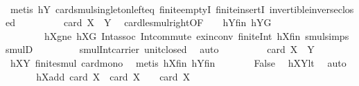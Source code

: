 \begin{isabellebody}
\ \ \ \ \ \ \isamarkupfalse%
\ {\isacharparenleft}{\kern0pt}metis\ hY{}\ card{\isacharunderscore}{\kern0pt}smul{\isacharunderscore}{\kern0pt}singleton{\isacharunderscore}{\kern0pt}left{\isacharunderscore}{\kern0pt}eq\ finite{\isachardot}{\kern0pt}emptyI\ finite{\isachardot}{\kern0pt}insertI\ invertible{\isacharunderscore}{\kern0pt}inverse{\isacharunderscore}{\kern0pt}closed{\isacharparenright}{\kern0pt}\isanewline
\ \ \ \ \isamarkupfalse%
\ \isamarkupfalse%
\ {\isachardoublequoteopen}{\isachardot}{\kern0pt}{\isachardot}{\kern0pt}{\isachardot}{\kern0pt}\ {\isasymle}\ card\ {\isacharparenleft}{\kern0pt}{\isacharquery}{\kern0pt}X{}\ {\isasymcdots}\ {\isacharquery}{\kern0pt}Y{}{\isacharparenright}{\kern0pt}{\isachardoublequoteclose}\ \isamarkupfalse%
\ card{\isacharunderscore}{\kern0pt}le{\isacharunderscore}{\kern0pt}smul{\isacharunderscore}{\kern0pt}right{\isacharbrackleft}{\kern0pt}OF\ {\isacharunderscore}{\kern0pt}\ {\isacharunderscore}{\kern0pt}\ {\isacharunderscore}{\kern0pt}\ hY{}fin\ hY{}G{\isacharbrackright}{\kern0pt}\ \isanewline
\ \ \ \ \ \ \ \ hXgne\ hXG\ Int{\isacharunderscore}{\kern0pt}assoc\ Int{\isacharunderscore}{\kern0pt}commute\ ex{\isacharunderscore}{\kern0pt}in{\isacharunderscore}{\kern0pt}conv\ finite{\isacharunderscore}{\kern0pt}Int\ hXfin\ smul{\isachardot}{\kern0pt}simps\ smul{\isacharunderscore}{\kern0pt}D{\isacharparenleft}{\kern0pt}{}{\isacharparenright}{\kern0pt}\ \isanewline
\ \ \ \ \ \ \ \ smul{\isacharunderscore}{\kern0pt}Int{\isacharunderscore}{\kern0pt}carrier\ unit{\isacharunderscore}{\kern0pt}closed\ \isamarkupfalse%
\ auto\isanewline
\ \ \ \ \isamarkupfalse%
\ \isamarkupfalse%
\ {\isachardoublequoteopen}{\isachardot}{\kern0pt}{\isachardot}{\kern0pt}{\isachardot}{\kern0pt}\ {\isasymle}\ card\ {\isacharparenleft}{\kern0pt}X\ {\isasymcdots}\ Y{\isacharparenright}{\kern0pt}{\isachardoublequoteclose}\ \isamarkupfalse%
\ hXY{}\ finite{\isacharunderscore}{\kern0pt}smul\ card{\isacharunderscore}{\kern0pt}mono\ \isamarkupfalse%
\ {\isacharparenleft}{\kern0pt}metis\ hXfin\ hYfin{\isacharparenright}{\kern0pt}\isanewline
\ \ \ \ \isamarkupfalse%
\ \isamarkupfalse%
\ False\ \isamarkupfalse%
\ hXYlt\ \isamarkupfalse%
\ auto\isanewline
\ \ \isamarkupfalse%
\isanewline
\ \ \isamarkupfalse%
\ hXadd{\isacharcolon}{\kern0pt}\ {\isachardoublequoteopen}card\ {\isacharquery}{\kern0pt}X{}\ {\isacharplus}{\kern0pt}\ card\ {\isacharquery}{\kern0pt}X{}\ {\isacharequal}{\kern0pt}\ {}\ {\isacharasterisk}{\kern0pt}\ card\ X{\isachardoublequoteclose}\ \isanewline

\end{isabellebody}
